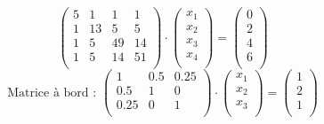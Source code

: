 \documentclass{report}
\begin{document}
        \begin{equation}
        \begin{pmatrix}
          5 & 1 & 1 & 1 \\
          1 & 13 & 5 & 5 \\
          1 & 5 & 49 & 14 \\
          1 & 5 & 14 & 51 \\
        \end{pmatrix}
        \cdot
        \begin{pmatrix}
          x_1 \\
          x_2 \\
          x_3 \\
          x_4 \\
        \end{pmatrix}
        =
        \begin{pmatrix}
          0 \\
          2 \\
          4 \\
          6 \\
        \end{pmatrix}
        \label{syst3}
        \end{equation}
        \begin{equation}
        \text{Matrice à bord : }
        \begin{pmatrix}
          1 & 0.5 & 0.25 \\
          0.5 & 1 & 0 \\
          0.25 & 0 & 1 \\
        \end{pmatrix}
        \cdot
        \begin{pmatrix}
          x_1 \\
          x_2 \\
          x_3 \\
        \end{pmatrix}
        =
        \begin{pmatrix}
          1 \\
          2 \\
          1 \\
        \end{pmatrix}
        \label{syst4}
        \end{equation}
\end{document}
